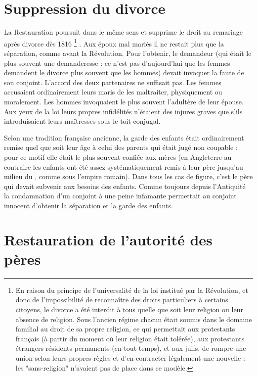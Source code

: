\section{Suppression du divorce}

 La Restauration poursuit dans le même sens et supprime le droit au remariage après divorce dès 1816%
\footnote{En raison du principe de l'universalité de la loi institué par la Révolution, et donc de l'impossibilité de reconnaître des droits particuliers à certains citoyens, le divorce a été interdit à tous quelle que soit leur religion ou leur absence de religion. Sous l'ancien régime chacun était soumis dans le domaine familial au droit de sa propre religion, ce qui permettait aux protestants français (à partir du moment où leur religion était tolérée), aux protestants étrangers résidents permanents (en tout temps), et aux juifs, de rompre une union selon leurs propres règles et d'en contracter légalement une nouvelle : les "sans-religion" n'avaient pas de place dans ce modèle.}%
. Aux époux mal mariés il ne restait plus que la séparation, comme avant la Révolution. Pour l'obtenir, le demandeur (qui était le plus souvent une demanderesse : ce n'est pas d'aujourd'hui que les femmes demandent le divorce plus souvent que les hommes) devait invoquer la faute de son conjoint. L'accord des deux partenaires ne suffisait pas. Les femmes accusaient ordinairement leurs maris de les maltraiter, physiquement ou moralement. Les hommes invoquaient le plus souvent l'adultère de leur épouse. Aux yeux de la loi leurs propres infidélités n'étaient des injures graves que s'ils introduisaient leurs maîtresses sous le toit conjugal. 

 Selon une tradition française ancienne, la garde des enfants était ordinairement remise quel que soit leur âge à celui des parents qui était jugé non coupable : pour ce motif elle était le plus souvent confiée aux mères (en Angleterre au contraire les enfants ont été assez systématiquement remis à leur père jusqu'au milieu du , comme sous l'empire romain). Dans tous les cas de figure, c'est le père qui devait subvenir aux besoins des enfants. Comme toujours depuis l'Antiquité la condamnation d'un conjoint à une peine infamante permettait au conjoint innocent d'obtenir la séparation et la garde des enfants.

\section{Restauration de l'autorité des pères}

